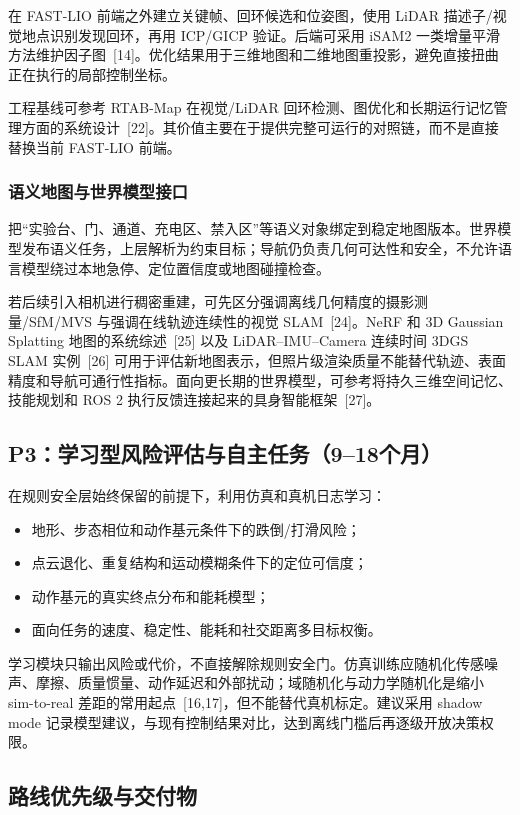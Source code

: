 \documentclass[11pt,a4paper,fontset=none]{ctexart}
\begin{document}
在 FAST-LIO 前端之外建立关键帧、回环候选和位姿图，使用 LiDAR 描述子/视觉地点识别发现回环，再用 ICP/GICP 验证。后端可采用 iSAM2 一类增量平滑方法维护因子图~[14]。优化结果用于三维地图和二维地图重投影，避免直接扭曲正在执行的局部控制坐标。

工程基线可参考 RTAB-Map 在视觉/LiDAR 回环检测、图优化和长期运行记忆管理方面的系统设计~[22]。其价值主要在于提供完整可运行的对照链，而不是直接替换当前 FAST-LIO 前端。

\subsubsection{语义地图与世界模型接口}

把“实验台、门、通道、充电区、禁入区”等语义对象绑定到稳定地图版本。世界模型发布语义任务，上层解析为约束目标；导航仍负责几何可达性和安全，不允许语言模型绕过本地急停、定位置信度或地图碰撞检查。

若后续引入相机进行稠密重建，可先区分强调离线几何精度的摄影测量/SfM/MVS 与强调在线轨迹连续性的视觉 SLAM~[24]。NeRF 和 3D Gaussian Splatting 地图的系统综述~[25] 以及 LiDAR--IMU--Camera 连续时间 3DGS SLAM 实例~[26] 可用于评估新地图表示，但照片级渲染质量不能替代轨迹、表面精度和导航可通行性指标。面向更长期的世界模型，可参考将持久三维空间记忆、技能规划和 ROS 2 执行反馈连接起来的具身智能框架~[27]。

\subsection{P3：学习型风险评估与自主任务（9--18个月）}

在规则安全层始终保留的前提下，利用仿真和真机日志学习：

\begin{itemize}
  \item 地形、步态相位和动作基元条件下的跌倒/打滑风险；
  \item 点云退化、重复结构和运动模糊条件下的定位可信度；
  \item 动作基元的真实终点分布和能耗模型；
  \item 面向任务的速度、稳定性、能耗和社交距离多目标权衡。
\end{itemize}

学习模块只输出风险或代价，不直接解除规则安全门。仿真训练应随机化传感噪声、摩擦、质量惯量、动作延迟和外部扰动；域随机化与动力学随机化是缩小 sim-to-real 差距的常用起点~[16,17]，但不能替代真机标定。建议采用 shadow mode 记录模型建议，与现有控制结果对比，达到离线门槛后再逐级开放决策权限。

\subsection{路线优先级与交付物}
\end{document}
